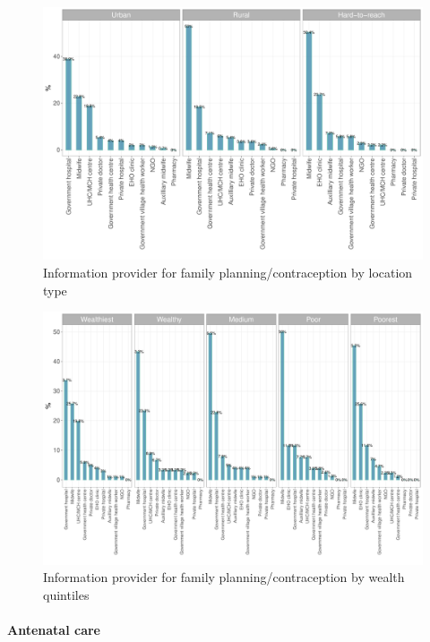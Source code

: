 \documentclass[12pt,a4paper]{article}
\let\oldparagraph\paragraph
\renewcommand{\paragraph}[1]{\oldparagraph{#1}\mbox{}}
\begin{document}
\begin{figure}[H]

{\centering \includegraphics{kayahReport_files/figure-latex/fplan5plot-1} 

}

\caption{Information provider for family planning/contraception by location type}\label{fig:fplan5plot}
\end{figure}

\begin{figure}[H]

{\centering \includegraphics{kayahReport_files/figure-latex/fplan6plot-1} 

}

\caption{Information provider for family planning/contraception by wealth quintiles}\label{fig:fplan6plot}
\end{figure}

\hypertarget{anc}{%
\paragraph{Antenatal care}\label{anc}}
\end{document}
